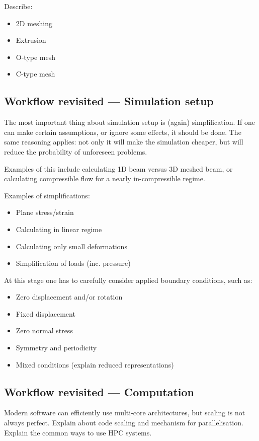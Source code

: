 \documentclass[12pt]{article}
\begin{document}
Describe:
\begin{itemize}
    \item 2D meshing
    \item Extrusion
    \item O-type mesh
    \item C-type mesh
\end{itemize}

\subsection{Workflow revisited --- Simulation setup}
The most important thing about simulation setup is (again) simplification. If one can make certain assumptions, or ignore some effects, it should be done. The same reasoning applies: not only it will make the simulation cheaper, but will reduce the probability of unforeseen problems.

Examples of this include calculating 1D beam versus 3D meshed beam, or calculating compressible flow for a nearly in-compressible regime.

Examples of simplifications:
\begin{itemize}
    \item Plane stress/strain
    \item Calculating in linear regime
    \item Calculating only small deformations
    \item Simplification of loads (inc. pressure)
\end{itemize}

At this stage one has to carefully consider applied boundary conditions, such as:
\begin{itemize}
    \item Zero displacement and/or rotation
    \item Fixed displacement
    \item Zero normal stress
    \item Symmetry and periodicity
    \item Mixed conditions (explain reduced representations)
\end{itemize}

\subsection{Workflow revisited --- Computation}
Modern software can efficiently use multi-core architectures, but scaling is not always perfect. Explain about code scaling and mechanism for parallelisation. Explain the common ways to use HPC systems.
\end{document}
